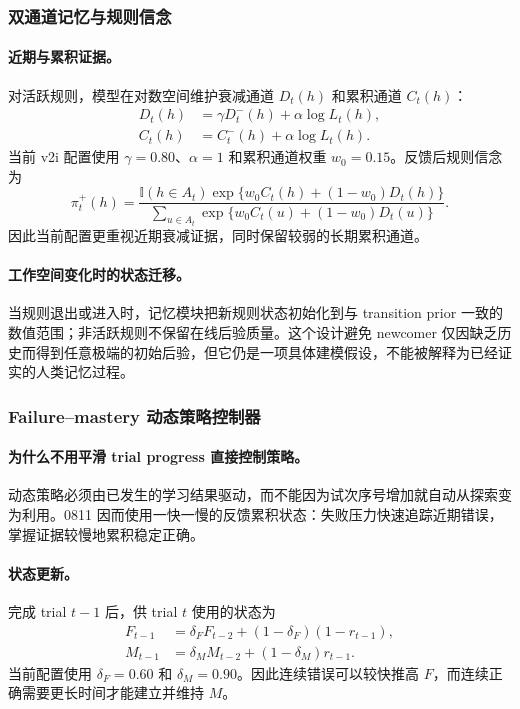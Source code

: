 \subsubsection{双通道记忆与规则信念}

\paragraph{近期与累积证据。}
对活跃规则，模型在对数空间维护衰减通道 $D_t(h)$ 和累积通道 $C_t(h)$：
\begin{align}
D_t(h)
&=\gamma D^-_t(h)+\alpha\log L_t(h),
\nonumber\\
C_t(h)
&=C^-_t(h)+\alpha\log L_t(h).
\label{eq:model0811-dual-memory}
\end{align}
当前 v2i 配置使用 $\gamma=0.80$、$\alpha=1$ 和累积通道权重 $w_0=0.15$。反馈后规则信念为
\begin{equation}
\pi^+_t(h)
=
\frac{\mathbb I(h\in A_t)
\exp\{w_0C_t(h)+(1-w_0)D_t(h)\}}
{\sum_{u\in A_t}
\exp\{w_0C_t(u)+(1-w_0)D_t(u)\}}.
\label{eq:model0811-memory-posterior}
\end{equation}
因此当前配置更重视近期衰减证据，同时保留较弱的长期累积通道。

\paragraph{工作空间变化时的状态迁移。}
当规则退出或进入时，记忆模块把新规则状态初始化到与 transition prior 一致的数值范围；非活跃规则不保留在线后验质量。这个设计避免 newcomer 仅因缺乏历史而得到任意极端的初始后验，但它仍是一项具体建模假设，不能被解释为已经证实的人类记忆过程。


\subsubsection{Failure--mastery 动态策略控制器}

\paragraph{为什么不用平滑 trial progress 直接控制策略。}
动态策略必须由已发生的学习结果驱动，而不能因为试次序号增加就自动从探索变为利用。0811 因而使用一快一慢的反馈累积状态：失败压力快速追踪近期错误，掌握证据较慢地累积稳定正确。

\paragraph{状态更新。}
完成 trial $t-1$ 后，供 trial $t$ 使用的状态为
\begin{align}
F_{t-1}
&=\delta_FF_{t-2}
+(1-\delta_F)(1-r_{t-1}),
\nonumber\\
M_{t-1}
&=\delta_MM_{t-2}
+(1-\delta_M)r_{t-1}.
\label{eq:model0811-failure-mastery}
\end{align}
当前配置使用 $\delta_F=0.60$ 和 $\delta_M=0.90$。因此连续错误可以较快推高 $F$，而连续正确需要更长时间才能建立并维持 $M$。

